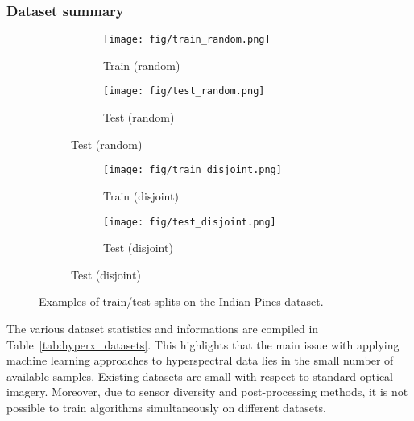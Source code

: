 \documentclass[journal]{IEEEtran}
\begin{document}
\subsubsection{Dataset summary}

\begin{figure}
	\begin{subfigure}{0.49\textwidth}
      \begin{subfigure}{0.48\textwidth}
      \texttt{[image: fig/train\_random.png]}
      \caption*{Train (random)}
      \end{subfigure}
      \begin{subfigure}{0.48\textwidth}
      \texttt{[image: fig/test\_random.png]}
      \caption*{Test (random)}
      \end{subfigure}
    \end{subfigure}
	\begin{subfigure}{0.49\textwidth}
    \begin{subfigure}{0.48\textwidth}
      \texttt{[image: fig/train\_disjoint.png]}
      \caption*{Train (disjoint)}
      \end{subfigure}
      \begin{subfigure}{0.48\textwidth}
      \texttt{[image: fig/test\_disjoint.png]}
      \caption*{Test (disjoint)}
      \end{subfigure}
    \end{subfigure}
    \caption{Examples of train/test splits on the Indian Pines dataset.}
    \label{fig:indianpines_gt}
\end{figure}

The various dataset statistics and informations are compiled in Table~\ref{tab:hyperx_datasets}.
This highlights that the main issue with applying machine learning approaches to hyperspectral data lies in the small number of available samples. Existing datasets are small with respect to standard optical imagery. Moreover, due to sensor diversity and post-processing methods, it is not possible to train algorithms simultaneously on different datasets.
\end{document}

